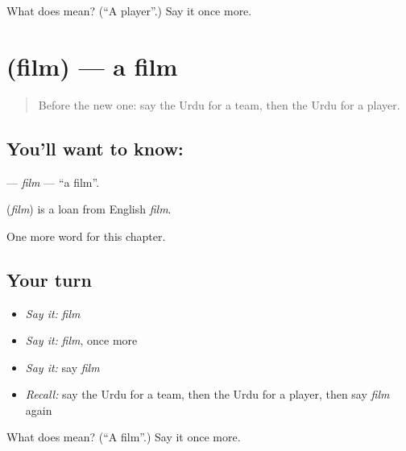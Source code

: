 \begin{tcolorbox}[breakable,colback=teal!4,colframe=teal!35!black,title={Before you move on}]
What does  mean? (\textquotedblleft{}A player\textquotedblright{}.) Say it once more.
\end{tcolorbox}
\section[\texorpdfstring{\ur{فلم} (film)}{فلم (film)}]{ (film) — a film}

\label{lesson:UR-C228-film}



\begin{quote}
Before the new one: say the Urdu for a team, then the Urdu for a player.
\end{quote}

\subsection*{You'll want to know: }
\textbf{} — \emph{film} — \textquotedblleft{}a film\textquotedblright{}.

\begin{cousinweb}
\textbf{} (\emph{film}) is a loan from English \emph{film}.
\end{cousinweb}

\begin{grammarlens}[title={What you've built}]
One more word for this chapter.
\end{grammarlens}

\subsection*{Your turn}
\begin{itemize}
\raggedright
  \item \emph{Say it:} \emph{film}
  \item \emph{Say it:} \emph{film}, once more
  \item \emph{Say it:} say \emph{film}
  \item \emph{Recall:} say the Urdu for a team, then the Urdu for a player, then say \emph{film} again
\end{itemize}

\begin{tcolorbox}[breakable,colback=teal!4,colframe=teal!35!black,title={Before you move on}]
What does  mean? (\textquotedblleft{}A film\textquotedblright{}.) Say it once more.
\end{tcolorbox}
